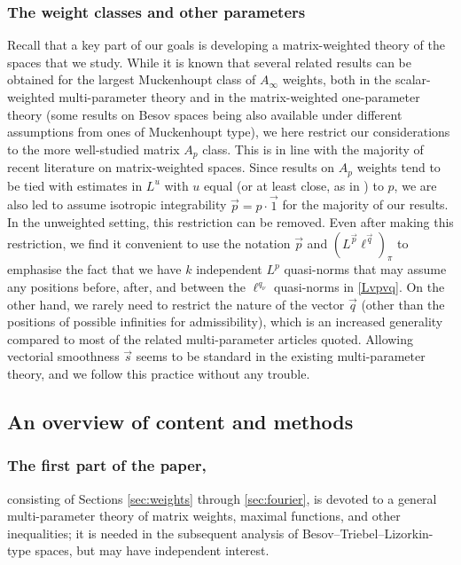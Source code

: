 \documentclass[11pt, reqno]{amsart}
\theoremstyle{definition}
\theoremstyle{remark}
\numberwithin{equation}{section}
\newcommand{\vone}{\vec 1}
\newcommand{\vp}{\vec p}
\newcommand{\vq}{\vec q}
\newcommand{\vs}{\vec s}
\begin{document}
\subsubsection*{The weight classes and other parameters}

Recall that a key part of our goals is developing a matrix-weighted theory
of the spaces that we study. While it is known that several related results can be obtained for the largest Muckenhoupt class of $A_\infty$ weights, both in the scalar-weighted multi-parameter theory \cite{CLL16,DCN19,DingZhu17,LuZhu13} and in the matrix-weighted one-parameter theory \cite{BHYY:2b,Vol97} (some results on Besov spaces \cite{Roud03} being also available under
different assumptions from ones of Muckenhoupt type), we here restrict our
considerations to the more well-studied matrix $A_p$ class. This is in line with the majority of recent literature on matrix-weighted spaces. Since results on $A_p$ weights tend to be tied with estimates in $L^u$ with $u$ equal (or at least close, as in \cite[Theorem 5.1]{Gold03}) to $p$, we are also led to assume isotropic integrability $\vp=p\cdot\vone$ for the majority of our results.
In the unweighted setting, this restriction can be removed.
Even after making this restriction, we find it convenient to use the notation $\vp$ and $(L^{\vp}\ell^{\vq})_\pi$ to emphasise the fact that we have $k$ independent $L^p$ quasi-norms that may assume any positions before, after, and between the $\ell^{q_\nu}$ quasi-norms in \eqref{Lvpvq}. On the other hand, we rarely need to restrict the nature of the vector $\vq$ (other than the positions of possible infinities for admissibility), which is an increased generality compared to most of the
related multi-parameter articles quoted. Allowing vectorial smoothness $\vs$ seems to be standard in the existing multi-parameter theory, and we follow this practice without any trouble.

\subsection{An overview of content and methods}

\subsubsection*{The first part of the paper,} consisting of Sections \ref{sec:weights} through \ref{sec:fourier},
is devoted to a general multi-parameter theory of matrix weights, maximal functions, and other inequalities; it is needed in the subsequent analysis of Besov--Triebel--Lizorkin-type spaces, but may have independent interest.
\end{document}
